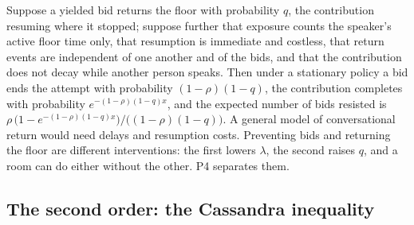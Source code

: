 \begin{remark}\label{rem:return}
Suppose a yielded bid returns the floor with probability $q$, the contribution resuming where it stopped; suppose further that exposure counts the speaker's active floor time only, that resumption is immediate and costless, that return events are independent of one another and of the bids, and that the contribution does not decay while another person speaks. Then under a stationary policy a bid ends the attempt with probability $(1-\rho)(1-q)$, the contribution completes with probability $e^{-(1-\rho)(1-q)x}$, and the expected number of bids resisted is $\rho\,\big(1 - e^{-(1-\rho)(1-q)x}\big)/\big((1-\rho)(1-q)\big)$. A general model of conversational return would need delays and resumption costs. Preventing bids and returning the floor are different interventions: the first lowers $\lambda$, the second raises $q$, and a room can do either without the other. P4 separates them.
\end{remark}

\subsection{The second order: the Cassandra inequality}

